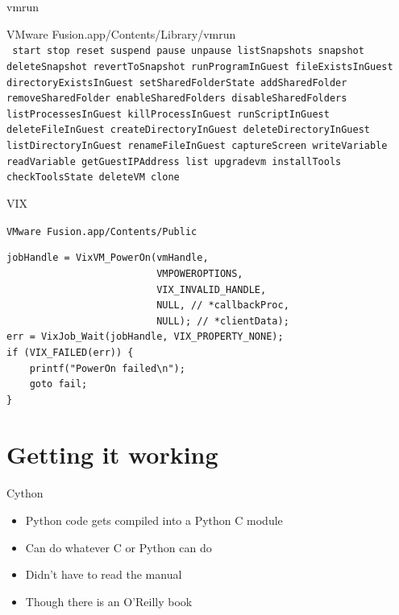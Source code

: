 \documentclass[xcolor=svgnames,17pt]{beamer}
\newcommand*{\sizefont}[1]{%
    \ifcase#1\relax
    \or \tiny
    \or \scriptsize
    \or \footnotesize
    \or \small
    \or \normalsize
    \or \large
    \or \Large
    \or \LARGE
    \or \huge
    \or \Huge
    \fi}
\begin{document}
\begin{frame}{vmrun}

VMware Fusion.app/Contents/Library/vmrun \\[0.25in]

\sizefont 2
\texttt{%
start stop reset suspend pause unpause listSnapshots snapshot
deleteSnapshot revertToSnapshot runProgramInGuest fileExistsInGuest
directoryExistsInGuest setSharedFolderState addSharedFolder
removeSharedFolder enableSharedFolders disableSharedFolders
listProcessesInGuest killProcessInGuest runScriptInGuest deleteFileInGuest
createDirectoryInGuest deleteDirectoryInGuest listDirectoryInGuest
renameFileInGuest captureScreen writeVariable readVariable
getGuestIPAddress list upgradevm installTools checkToolsState
deleteVM clone
}

\end{frame}

\begin{frame}[fragile]{VIX}

\texttt{VMware Fusion.app/Contents/Public} \\

\small
{}

\sizefont 2
\begin{verbatim}
jobHandle = VixVM_PowerOn(vmHandle,
                          VMPOWEROPTIONS,
                          VIX_INVALID_HANDLE,
                          NULL, // *callbackProc,
                          NULL); // *clientData);
err = VixJob_Wait(jobHandle, VIX_PROPERTY_NONE);
if (VIX_FAILED(err)) {
    printf("PowerOn failed\n");
    goto fail;
}
\end{verbatim}

\end{frame}

\section{Getting it working}

\begin{frame}{}
\tableofcontents[currentsection]
\end{frame}

\begin{frame}{Cython}

\begin{itemize}
\item Python code gets compiled into a Python C module
\item Can do whatever C or Python can do
\item Didn’t have to read the manual
\item Though there is an O’Reilly book
\end{itemize}

\end{frame}
\end{document}
